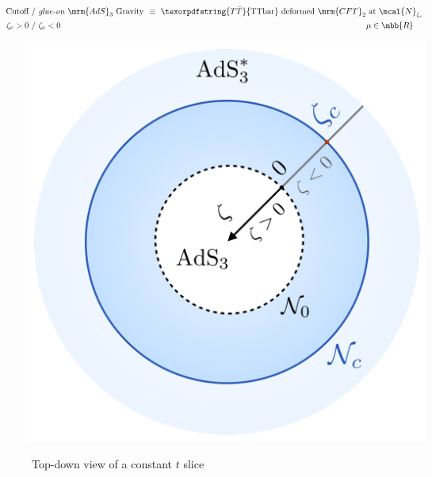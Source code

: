 \documentclass[10pt]{article}
\newcommand{\TTbar}{\texorpdfstring{\ensuremath{T\bar{T}}}{TTbar}\xspace}
\begin{document}
\begin{multicols}{3}
\parbox{\linewidth}{
\vspace{-\baselineskip}
\textbf{\begin{equation*}
\hspace{-2.8em}
\begin{aligned}
	\textrm{Cutoff}
	\ &/\ %
	\text{\textit{glue-on} $\mrm{AdS}_3$ Gravity}
	\!\!&\equiv\ %
	\textrm{\TTbar deformed $\mrm{CFT}_2$ at $\mcal{N}_{\zeta_c}$} \\
	\zeta_c > 0
	\ &/\ %
	\zeta_c < 0
	& \mu \in \mbb{R}\hspace{1em}\,
\end{aligned}
\end{equation*}}
\begin{center}
	\vspace{-1\baselineskip}%

	\centering
	\includegraphics[width=.8\linewidth]{img/diagram.png}
	
	\scriptsize\ Top-down view of a constant $t$ slice
\end{center}
}

\begin{itemize}


\end{itemize}
\end{multicols}
\end{document}
